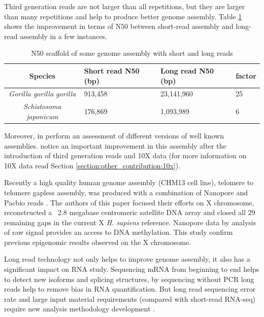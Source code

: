 \documentclass[main]{subfiles}
\begin{document}
Third generation reads are not larger than all repetitions, but they are larger than many repetitions and help to produce better genome assembly. Table \ref{intro:tab:sr_lr_assembly} shows the improvement in terms of N50 between short-read assembly and long-read assembly in a few instances. 

\begin{table}[]
    \centering
    \begin{tabular}{c|lll}
        Species & Short read N50 (bp) & Long read N50 (bp) & factor \\ \hline
        \textit{Gorilla gorilla gorilla} & 913,458 \cite{gorilla_sr_assembly} & 23,141,960 \cite{gorilla_genome} & 25 \\
        \textit{Schistosoma japonicum} & 176,869 \cite{s_japonicum_sr_assembly} & 1,093,989 \cite{s_japonicum_3rd_gene_improvement} & 6 \\
    \end{tabular}
    \caption{N50 scaffold of some genome assembly with short and long reads}
    \label{intro:tab:sr_lr_assembly}
\end{table}

Moreover, \citeauthor{dnAQET} in \cite{dnAQET} perform an assessment of different versions of well known assemblies. \citeauthor{dnAQET} notice an important improvement in this assembly after the introduction of third generation reads and 10X data (for more information on 10X data read Section \ref{section:other_contribution:10x}).

Recently a high quality human genome assembly (CHM13 cell line), telomere to telomere gapless assembly, was produced with a combination of Nanopore and Pacbio reads \cite{telomere2telomere}. The authors of this paper focused their efforts on X chromosome, reconstructed a ~2.8 megabase centromeric satellite DNA array and closed all 29 remaining gaps in the current X \textit{H. sapiens} reference. Nanopore data by analysis of raw signal provides an access to DNA methylation. This study confirm previous epigenomic results observed on the X chromosome.

Long read technology not only helps to improve genome assembly, it also has a significant impact on RNA study. Sequencing mRNA from beginning to end helps to detect new isoforms and splicing structures, by sequencing without PCR long reads help to remove bias in RNA quantification. But long read sequencing error rate and large input material requirements (compared with short-read RNA-seq) require new analysis methodology development \cite{review_lr_rna}. 
\end{document}
